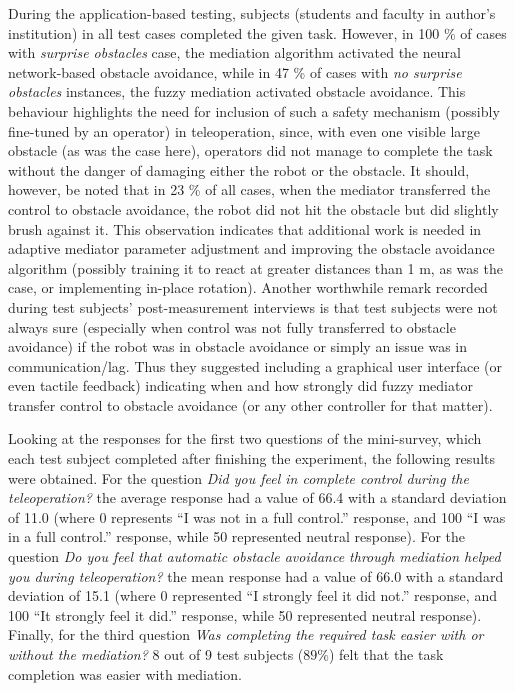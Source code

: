 During the application-based testing, subjects (students and faculty in author's institution) in all test cases completed the given task. However, in 100 \% of cases with \emph{surprise obstacles} case, the mediation algorithm activated the neural network-based obstacle avoidance, while in 47 \% of cases with \emph{no surprise obstacles} instances, the fuzzy mediation activated obstacle avoidance. This behaviour highlights the need for inclusion of such a safety mechanism (possibly fine-tuned by an operator) in teleoperation, since, with even one visible large obstacle (as was the case here), operators did not manage to complete the task without the danger of damaging either the robot or the obstacle. It should, however, be noted that in 23 \% of all cases, when the mediator transferred the control to obstacle avoidance, the robot did not hit the obstacle but did slightly brush against it. This observation indicates that additional work is needed in adaptive mediator parameter adjustment and improving the obstacle avoidance algorithm (possibly training it to react at greater distances than 1 m, as was the case, or implementing in-place rotation). Another worthwhile remark recorded during test subjects' post-measurement interviews is that test subjects were not always sure (especially when control was not fully transferred to obstacle avoidance) if the robot was in obstacle avoidance or simply an issue was in communication/lag. Thus they suggested including a graphical user interface (or even tactile feedback) indicating when and how strongly did fuzzy mediator transfer control to obstacle avoidance (or any other controller for that matter).

Looking at the responses for the first two questions of the mini-survey, which each test subject completed after finishing the experiment, the following results were obtained. For the question \emph{Did you feel in complete control during the teleoperation?} the average response had a value of 66.4 with a standard deviation of 11.0 (where 0 represents ``I was not in a full control.'' response, and 100 ``I was in a full control.'' response, while 50 represented neutral response). For the question \emph{Do you feel that automatic obstacle avoidance through mediation helped you during teleoperation?} the mean response had a value of 66.0 with a standard deviation of 15.1 (where 0 represented ``I strongly feel it did not.'' response, and 100 ``It strongly feel it did.'' response, while 50 represented neutral response). Finally, for the third question \emph{Was completing the required task easier with or without the mediation?} 8 out of 9 test subjects ($89\%$) felt that the task completion was easier with mediation.

